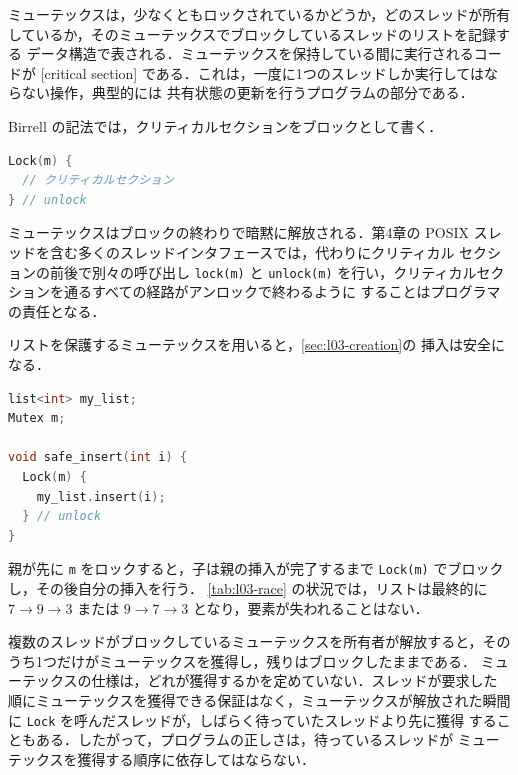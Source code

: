 \documentclass[../main.tex]{subfiles}
\begin{document}
ミューテックスは，少なくともロックされているかどうか，どのスレッドが所有
しているか，そのミューテックスでブロックしているスレッドのリストを記録する
データ構造で表される．ミューテックスを保持している間に実行されるコードが
[critical section]%
である．これは，一度に1つのスレッドしか実行してはならない操作，典型的には
共有状態の更新を行うプログラムの部分である．

Birrell の記法では，クリティカルセクションをブロックとして書く．
\begin{lstlisting}[language=C, numbers=none]
Lock(m) {
  // クリティカルセクション
} // unlock
\end{lstlisting}
ミューテックスはブロックの終わりで暗黙に解放される．第4章の POSIX
スレッドを含む多くのスレッドインタフェースでは，代わりにクリティカル
セクションの前後で別々の呼び出し \texttt{lock(m)} と \texttt{unlock(m)}
を行い，クリティカルセクションを通るすべての経路がアンロックで終わるように
することはプログラマの責任となる．

\begin{example}
  リストを保護するミューテックスを用いると，\cref{sec:l03-creation}の
  挿入は安全になる．
  \begin{lstlisting}[language=C, numbers=none]
list<int> my_list;
Mutex m;

void safe_insert(int i) {
  Lock(m) {
    my_list.insert(i);
  } // unlock
}
\end{lstlisting}
  親が先に \texttt{m} をロックすると，子は親の挿入が完了するまで
  \texttt{Lock(m)} でブロックし，その後自分の挿入を行う．
  \cref{tab:l03-race} の状況では，リストは最終的に $7\to 9\to 3$ または
  $9\to 7\to 3$ となり，要素が失われることはない．
\end{example}

複数のスレッドがブロックしているミューテックスを所有者が解放すると，その
うち1つだけがミューテックスを獲得し，残りはブロックしたままである．%
ミューテックスの仕様は，どれが獲得するかを定めていない．スレッドが要求した
順にミューテックスを獲得できる保証はなく，ミューテックスが解放された瞬間に
\texttt{Lock} を呼んだスレッドが，しばらく待っていたスレッドより先に獲得
することもある．したがって，プログラムの正しさは，待っているスレッドが
ミューテックスを獲得する順序に依存してはならない．
\end{document}
